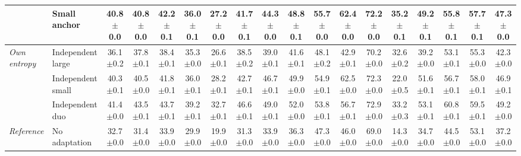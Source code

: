 \begin{table}[t]
{\begin{tabular}{ll|ccc|cccc|cccc|cccc|c}
         & Small anchor & 40.8 {\scriptsize$\pm$0.0} & 40.8 {\scriptsize$\pm$0.0} & 42.2 {\scriptsize$\pm$0.1} & 36.0 {\scriptsize$\pm$0.1} & 27.2 {\scriptsize$\pm$0.0} & 41.7 {\scriptsize$\pm$0.1} & 44.3 {\scriptsize$\pm$0.0} & 48.8 {\scriptsize$\pm$0.1} & 55.7 {\scriptsize$\pm$0.0} & 62.4 {\scriptsize$\pm$0.0} & 72.2 {\scriptsize$\pm$0.0} & 35.2 {\scriptsize$\pm$0.1} & 49.2 {\scriptsize$\pm$0.1} & 55.8 {\scriptsize$\pm$0.1} & 57.7 {\scriptsize$\pm$0.1} & 47.3 {\scriptsize$\pm$0.0} \\
        \midrule
        \multirow{3}{*}{\textit{Own entropy}} & Independent large & 36.1 {\scriptsize$\pm$0.2} & 37.8 {\scriptsize$\pm$0.1} & 38.4 {\scriptsize$\pm$0.1} & 35.3 {\scriptsize$\pm$0.0} & 26.6 {\scriptsize$\pm$0.1} & 38.5 {\scriptsize$\pm$0.2} & 39.0 {\scriptsize$\pm$0.1} & 41.6 {\scriptsize$\pm$0.1} & 48.1 {\scriptsize$\pm$0.2} & 42.9 {\scriptsize$\pm$0.1} & 70.2 {\scriptsize$\pm$0.0} & 32.6 {\scriptsize$\pm$0.2} & 39.2 {\scriptsize$\pm$0.0} & 53.1 {\scriptsize$\pm$0.1} & 55.3 {\scriptsize$\pm$0.0} & 42.3 {\scriptsize$\pm$0.0} \\
         & Independent small & 40.3 {\scriptsize$\pm$0.1} & 40.5 {\scriptsize$\pm$0.0} & 41.8 {\scriptsize$\pm$0.1} & 36.0 {\scriptsize$\pm$0.1} & 28.2 {\scriptsize$\pm$0.1} & 42.7 {\scriptsize$\pm$0.1} & 46.7 {\scriptsize$\pm$0.1} & 49.9 {\scriptsize$\pm$0.0} & 54.9 {\scriptsize$\pm$0.1} & 62.5 {\scriptsize$\pm$0.0} & 72.3 {\scriptsize$\pm$0.0} & 22.0 {\scriptsize$\pm$0.5} & 51.6 {\scriptsize$\pm$0.1} & 56.7 {\scriptsize$\pm$0.1} & 58.0 {\scriptsize$\pm$0.1} & 46.9 {\scriptsize$\pm$0.1} \\
         & Independent duo & 41.4 {\scriptsize$\pm$0.0} & 43.5 {\scriptsize$\pm$0.1} & 43.7 {\scriptsize$\pm$0.1} & 39.2 {\scriptsize$\pm$0.1} & 32.7 {\scriptsize$\pm$0.1} & 46.6 {\scriptsize$\pm$0.1} & 49.0 {\scriptsize$\pm$0.1} & 52.0 {\scriptsize$\pm$0.0} & 53.8 {\scriptsize$\pm$0.1} & 56.7 {\scriptsize$\pm$0.1} & 72.9 {\scriptsize$\pm$0.0} & 33.2 {\scriptsize$\pm$0.3} & 53.1 {\scriptsize$\pm$0.1} & 60.8 {\scriptsize$\pm$0.1} & 59.5 {\scriptsize$\pm$0.1} & 49.2 {\scriptsize$\pm$0.0} \\
        \midrule
        \multirow{1}{*}{\textit{Reference}} & No adaptation & 32.7 {\scriptsize$\pm$0.0} & 31.4 {\scriptsize$\pm$0.0} & 33.9 {\scriptsize$\pm$0.0} & 29.9 {\scriptsize$\pm$0.0} & 19.9 {\scriptsize$\pm$0.0} & 31.3 {\scriptsize$\pm$0.0} & 33.9 {\scriptsize$\pm$0.0} & 36.3 {\scriptsize$\pm$0.0} & 47.3 {\scriptsize$\pm$0.0} & 46.0 {\scriptsize$\pm$0.0} & 69.0 {\scriptsize$\pm$0.0} & 14.3 {\scriptsize$\pm$0.0} & 34.7 {\scriptsize$\pm$0.0} & 44.5 {\scriptsize$\pm$0.0} & 53.1 {\scriptsize$\pm$0.0} & 37.2 {\scriptsize$\pm$0.0} \\
        \bottomrule
    \end{tabular}%
    }
\end{table}
